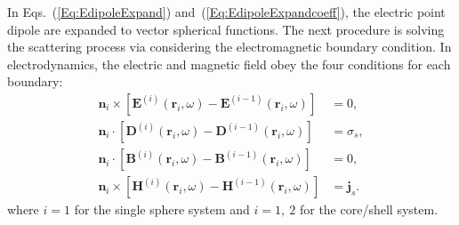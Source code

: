 \documentclass[journal=jacsat,manuscript=article,layout=traditional]{achemso}
\newcommand*\br{\mathbf{r}}
\begin{document}
\noindent
In Eqs.~(\ref{Eq:EdipoleExpand}) and~(\ref{Eq:EdipoleExpandcoeff}), the electric point dipole are expanded to vector spherical functions.
The next procedure is solving the scattering process via considering the electromagnetic boundary condition.
In electrodynamics, the electric and magnetic field obey the four conditions for each boundary:
\begin{subequations}
    \begin{align}
        \label{boundE}
        \mathbf{n}_{i} \times \left[ \mathbf{E}^{(i)}(\mathbf{r}_{i},\omega) - \mathbf{E}^{(i-1)}(\mathbf{r}_{i},\omega)\right] &= 0,\\
        \label{boundD}
        \mathbf{n}_{i} \cdot \left[ \mathbf{D}^{(i)}(\mathbf{r}_{i},\omega) - \mathbf{D}^{(i-1)}(\mathbf{r}_{i},\omega)\right] &= \sigma_s,\\
        \label{boundB}
        \mathbf{n}_{i} \cdot \left[ \mathbf{B}^{(i)}(\mathbf{r}_{i},\omega) - \mathbf{B}^{(i-1)}(\mathbf{r}_{i},\omega)\right] &= 0,\\
        \label{boundH}
        \mathbf{n}_{i} \times \left[ \mathbf{H}^{(i)}(\mathbf{r}_{i},\omega) - \mathbf{H}^{(i-1)}(\mathbf{r}_{i},\omega)\right] &= \mathbf{j}_s
        .%
    \end{align}
    \label{Eq:EBC}%
\end{subequations}
where $i=1$ for the single sphere system and $i=1,~2$ for the core/shell system.
\end{document}
